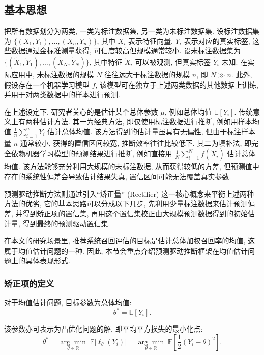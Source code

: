 \documentclass[a4paper, AutoFakeBold, UTF8]{ctexrep}
\theoremstyle{plain}
\numberwithin{equation}{chapter}
\begin{document}
\subsection{基本思想}

把所有数据划分为两类, 一类为标注数据集, 另一类为未标注数据集. 设标注数据集为 $\{ (X_1, Y_1), \ldots,  (X_n, Y_n) \}$, 其中 $X_i$ 表示特征向量, $Y_i$ 表示对应的真实标签, 这些数据通过金标准测量获得, 可信度较高但规模通常较小. 设未标注数据集为 $\{ (\tilde{X}_1, \tilde{Y}_1), \ldots,  (\tilde{X}_N, \tilde{Y}_N) \}$, 其中特征 $\tilde{X}_i$ 可以被观测, 但真实标签 $\tilde{Y}_i$ 未知. 在实际应用中, 未标注数据的规模 $N$ 往往远大于标注数据的规模 $n$, 即 $N \gg n$. 此外, 假设存在一个机器学习模型 $f$, 该模型可在独立于上述两类数据的其他数据上训练, 并用于对两类数据中的样本进行预测. 

在上述设定下, 研究者关心的是估计某个总体参数 $\mu$, 例如总体均值 $\mathbb{E}[Y_i]$. 传统意义上有两种估计方法. 其一为经典方法, 即仅使用标注数据进行推断, 例如用样本均值 $\frac{1}{n}\sum_{i=1}^n Y_i$ 估计总体均值. 该方法得到的估计量虽具有无偏性, 但由于标注样本量 $n$ 通常较小, 获得的置信区间较宽, 推断效率往往比较低下. 其二为填补法, 即完全依赖机器学习模型的预测结果进行推断, 例如直接用 $\frac{1}{N}\sum_{i=1}^N f (\tilde{X}_i) $ 估计总体均值. 该方法能够充分利用大规模的未标注数据, 从而获得较低的方差, 但预测值中存在的系统性偏差会导致估计结果失真, 置信区间可能无法覆盖真实参数. 

预测驱动推断方法则通过引入``矫正量'' (Rectifier) 这一核心概念来平衡上述两种方法的优劣, 它的基本思路可以分成以下几步, 先利用少量标注数据来估计预测偏差, 并得到矫正项的置信集, 再用这个置信集校正由大规模预测数据得到的初始估计量, 得到最终的预测驱动置信集. 

在本文的研究场景里, 推荐系统召回评估的目标是估计总体加权召回率的均值, 这属于均值估计问题的一种. 因此, 本节会重点介绍预测驱动推断框架在均值估计问题上的具体表现形式. 

\subsubsection{矫正项的定义}

对于均值估计问题, 目标参数为总体均值: 
\begin{equation}
\theta^* = \mathbb{E}[Y_i]. \label{eq: theta_star}
\end{equation}

该参数亦可表示为凸优化问题的解, 即平均平方损失的最小化点: 
\begin{equation}
\theta^* = \underset{\theta \in \mathbb{R}}{\arg\min} \;  \mathbb{E}\bigl[\ell_{\theta} (Y_i) \bigr] = \underset{\theta \in \mathbb{R}}{\arg\min} \;  \mathbb{E}\left[\frac{1}{2} (Y_i - \theta) ^2\right]. \label{eq: theta_min}
\end{equation}
\end{document}
